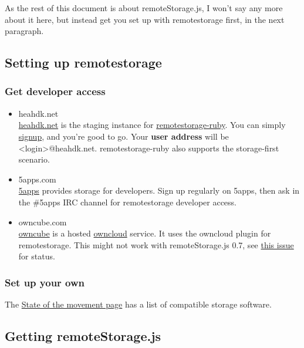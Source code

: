 \documentclass[11pt]{article}
\begin{document}
   As the rest of this document is about remoteStorage.js, I won't say any more about it here, but instead get you set up with remotestorage first, in the next paragraph.
\subsection{Setting up remotestorage}
\label{sec-1-5}
\subsubsection{Get developer access}
\label{sec-1-5-1}
\begin{itemize}

\item heahdk.net\\
\label{sec-1-5-1-1}%
\href{https://heahdk.net/}{heahdk.net} is the staging instance for \href{https://github.com/RemoteStorage/remotestorage-ruby}{remotestorage-ruby}. You can simply \href{https://heahdk.net/users/new}{signup}, and you're good to go.
     Your \textbf{user address} will be <login>@heahdk.net.
     remotestorage-ruby also supports the storage-first scenario.

\item 5apps.com\\
\label{sec-1-5-1-2}%
\href{http://5apps.com/}{5apps} provides storage for developers. Sign up regularly on 5apps, then ask in the \#5apps IRC channel for remotestorage developer access.

\item owncube.com\\
\label{sec-1-5-1-3}%
\href{https://owncube.com}{owncube} is a hosted \href{http://owncloud.org}{owncloud} service. It uses the owncloud plugin for remotestorage. This might not work with remoteStorage.js 0.7, see \href{https://github.com/RemoteStorage/remoteStorage.js/issues/52}{this issue} for status.
\end{itemize} %
\subsubsection{Set up your own}
\label{sec-1-5-2}

    The \href{https://github.com/unhosted/website/wiki/State-of-the-movement}{State of the movement page} has a list of compatible storage software.
\subsection{Getting remoteStorage.js}
\label{sec-1-6}
\end{document}

